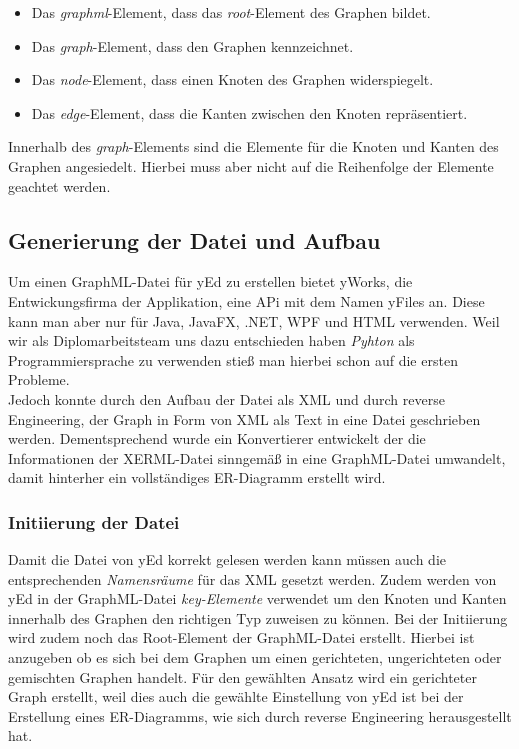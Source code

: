 \begin{itemize}
	\item Das \textit{graphml}-Element, dass das \textit{root}-Element des Graphen bildet.
	\item Das \textit{graph}-Element, dass den Graphen kennzeichnet.
	\item Das \textit{node}-Element, dass einen Knoten des Graphen widerspiegelt.
	\item Das \textit{edge}-Element, dass die Kanten zwischen den Knoten repräsentiert.
	\\
\end{itemize}

\noindent
Innerhalb des \textit{graph}-Elements sind die Elemente für die Knoten und Kanten des Graphen angesiedelt. Hierbei muss aber nicht auf die Reihenfolge der Elemente geachtet werden.

\subsection{Generierung der Datei und Aufbau}

Um einen GraphML-Datei für yEd zu erstellen bietet yWorks, die Entwickungsfirma der Applikation, eine APi mit dem Namen yFiles an. Diese kann man aber nur für Java, JavaFX, .NET, WPF und HTML verwenden. Weil wir als Diplomarbeitsteam uns dazu entschieden haben \textit{Pyhton} als Programmiersprache zu verwenden stieß man hierbei schon auf die ersten Probleme. 
\\

\noindent
Jedoch konnte durch den Aufbau der Datei als XML und durch reverse Engineering, der Graph in Form von XML als Text in eine Datei geschrieben werden. Dementsprechend wurde ein Konvertierer entwickelt der die Informationen der XERML-Datei sinngemäß in eine GraphML-Datei umwandelt, damit hinterher ein vollständiges ER-Diagramm erstellt wird.

\subsubsection{Initiierung der Datei}

Damit die Datei von yEd korrekt gelesen werden kann müssen auch die entsprechenden \textit{Namensräume} für das XML gesetzt werden. Zudem werden von yEd in der GraphML-Datei \textit{key-Elemente} verwendet um den Knoten und Kanten innerhalb des Graphen den richtigen Typ zuweisen zu können. Bei der Initiierung wird zudem noch das Root-Element der GraphML-Datei erstellt. Hierbei ist anzugeben ob es sich bei dem Graphen um einen gerichteten, ungerichteten oder gemischten Graphen handelt. Für den gewählten Ansatz wird ein gerichteter Graph erstellt, weil dies auch die gewählte Einstellung von yEd ist bei der Erstellung eines ER-Diagramms, wie sich durch reverse Engineering herausgestellt hat.
\\

